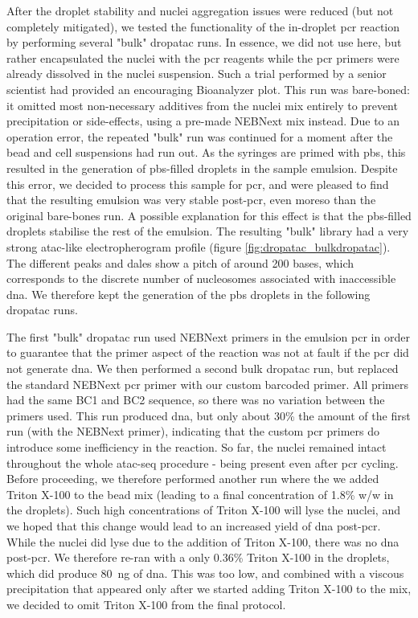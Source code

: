 After the droplet stability and nuclei aggregation issues were reduced (but not completely mitigated), we tested the functionality of the in-droplet \acrshort{pcr} reaction by performing several "bulk" \acrshort{dropatac} runs. In essence, we did not use  here, but rather encapsulated the nuclei with the \acrshort{pcr} reagents while the \acrshort{pcr} primers were already dissolved in the nuclei suspension. Such a trial performed by a senior scientist had provided an encouraging Bioanalyzer plot. This run was bare-boned: it omitted most non-necessary additives from the nuclei mix entirely to prevent precipitation or side-effects, using a pre-made NEBNext mix instead. Due to an operation error, the repeated "bulk" run was continued for a moment after the bead and cell suspensions had run out. As the syringes are primed with \acrshort{pbs}, this resulted in the generation of \acrshort{pbs}-filled droplets in the sample emulsion. Despite this error, we decided to process this sample for \acrshort{pcr}, and were pleased to find that the resulting emulsion was very stable post-\acrshort{pcr}, even moreso than the original bare-bones run. A possible explanation for this effect is that the \acrshort{pbs}-filled droplets stabilise the rest of the emulsion. The resulting "bulk" library had a very strong \acrshort{atac}-like electropherogram profile (figure \ref{fig:dropatac_bulkdropatac}). The different peaks and dales show a pitch of around 200 bases, which corresponds to the discrete number of nucleosomes associated with inaccessible \acrshort{dna}. We therefore kept the generation of the \acrshort{pbs} droplets in the following \acrshort{dropatac} runs.\pms

The first "bulk" \acrshort{dropatac} run used NEBNext primers in the emulsion \acrshort{pcr} in order to guarantee that the primer aspect of the reaction was not at fault if the \acrshort{pcr} did not generate \acrshort{dna}. We then performed a second bulk \acrshort{dropatac} run, but replaced the standard NEBNext \acrshort{pcr} primer with our custom barcoded primer. All primers had the same BC1 and BC2 sequence, so there was no variation between the primers used. This run produced \acrshort{dna}, but only about 30\% the amount of the first run (with the NEBNext primer), indicating that the custom \acrshort{pcr} primers do introduce some inefficiency in the reaction. So far, the nuclei remained intact throughout the whole \acrshort{atac-seq} procedure - being present even after \acrshort{pcr} cycling. Before proceeding, we therefore performed another run where the we added Triton X-100 to the bead mix (leading to a final concentration of 1.8\% w/w in the droplets). Such high concentrations of Triton X-100 will lyse the nuclei, and we hoped that this change would lead to an increased yield of \acrshort{dna} post-\acrshort{pcr}. While the nuclei did lyse due to the addition of Triton X-100, there was no \acrshort{dna} post-\acrshort{pcr}. We therefore re-ran with a only 0.36\% Triton X-100 in the droplets, which did produce \SI{80}{\ng} of \acrshort{dna}. This was too low, and combined with a viscous precipitation that appeared only after we started adding Triton X-100 to the mix, we decided to omit Triton X-100 from the final protocol.

